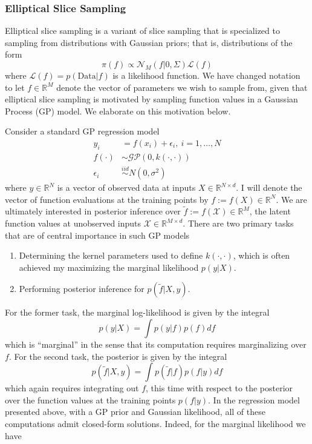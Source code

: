\documentclass[12pt]{article}
\newcommand{\R}{\mathcal{R}}
\def\R{\mathbb{R}}
\begin{document}
\subsubsection{Elliptical Slice Sampling}
Elliptical slice sampling is a variant of slice sampling that is specialized to sampling from distributions with Gaussian priors; that is, distributions of the form 
\[\pi(f) \propto \mathcal{N}_M(f|0, \Sigma)\mathcal{L}(f)\]
where $\mathcal{L}(f) = p(\text{Data}|f)$ is a likelihood function. We have changed notation to let $f \in \R^M$ denote the vector of parameters we wish to sample from, given that elliptical slice sampling 
is motivated by sampling function values in a Gaussian Process (GP) model. We elaborate on this motivation below. 

\bigskip
\noindent
Consider a standard GP regression model
\begin{align*}
y_i &= f(x_i) + \epsilon_i, \ i = 1, \dots, N \\
f(\cdot) &\sim \mathcal{GP}(0, k(\cdot, \cdot)) \\
\epsilon_i &\overset{iid}{\sim} N(0, \sigma^2)
\end{align*}
where $y \in \R^N$ is a vector of observed data at inputs $X \in \R^{N \times d}$. I will denote the vector of function evaluations at the training points by $f := f(X) \in \R^N$. 
We are ultimately interested in posterior inference over  $\tilde{f} := f(\mathcal{X}) \in \R^M$, the latent function values at unobserved inputs $\mathcal{X} \in \R^{M \times d}$.
There are two primary tasks that are of central importance in such GP models 
\begin{enumerate}
\item Determining the kernel parameters used to define $k(\cdot, \cdot)$, which is often achieved my maximizing the marginal likelihood $p(y|X)$. 
\item Performing posterior inference for $p(\tilde{f}|X, y)$.
\end{enumerate}
For the former task, the marginal log-likelihood is given by the integral
\[p(y|X) = \int p(y|f)p(f) df\] 
which is ``marginal'' in the sense that its computation requires marginalizing over $f$. For the second task, the posterior is given by the integral
\[p(\tilde{f}|X, y) = \int p(\tilde{f}|f)p(f|y) df\]
which again requires integrating out $f$, this time with respect to the posterior over the function values at the training points $p(f|y)$. In the regression model presented above, with 
a GP prior and Gaussian likelihood, all of these computations admit closed-form solutions. Indeed, for the marginal likelihood we have 
\end{document}
